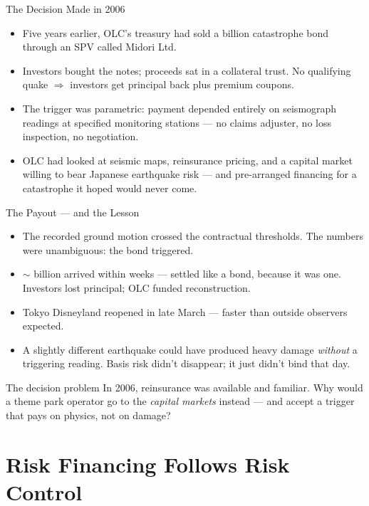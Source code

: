 \documentclass[11pt, aspectratio=169]{beamer}
\begin{document}
\begin{frame}{The Decision Made in 2006}
\begin{itemize}
  \item Five years earlier, OLC's treasury had sold a  billion \alert{catastrophe bond} through an SPV called Midori Ltd.
  \item Investors bought the notes; proceeds sat in a collateral trust. No qualifying quake $\Rightarrow$ investors get principal back plus premium coupons.
  \item The trigger was \alert{parametric}: payment depended entirely on seismograph readings at specified monitoring stations --- no claims adjuster, no loss inspection, no negotiation.
  \item OLC had looked at seismic maps, reinsurance pricing, and a capital market willing to bear Japanese earthquake risk --- and pre-arranged financing for a catastrophe it hoped would never come.
\end{itemize}
\end{frame}

\begin{frame}{The Payout --- and the Lesson}
\begin{itemize}
  \item The recorded ground motion crossed the contractual thresholds. The numbers were unambiguous: \alert{the bond triggered}.
  \item $\sim$ billion arrived within weeks --- settled like a bond, because it was one. Investors lost principal; OLC funded reconstruction.
  \item Tokyo Disneyland reopened in late March --- faster than outside observers expected.
  \item A slightly different earthquake could have produced heavy damage \emph{without} a triggering reading. Basis risk didn't disappear; it just didn't bind that day.
\end{itemize}
\medskip
\begin{block}{The decision problem}
In 2006, reinsurance was available and familiar. Why would a theme park operator go to the \emph{capital markets} instead --- and accept a trigger that pays on physics, not on damage?
\end{block}
\end{frame}

\section{Risk Financing Follows Risk Control}
\end{document}
